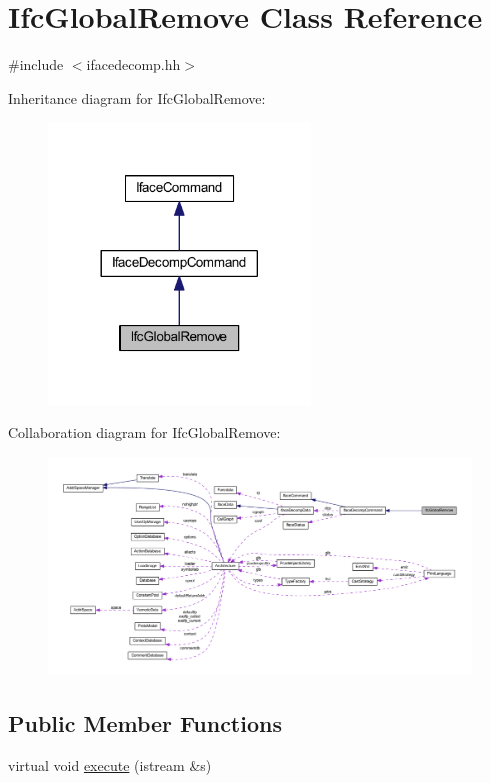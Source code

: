 \hypertarget{class_ifc_global_remove}{}\section{Ifc\+Global\+Remove Class Reference}
\label{class_ifc_global_remove}


{\ttfamily \#include $<$ifacedecomp.\+hh$>$}



Inheritance diagram for Ifc\+Global\+Remove\+:
\nopagebreak
\begin{figure}[H]
\begin{center}
\leavevmode
\includegraphics[width=197pt]{class_ifc_global_remove__inherit__graph}
\end{center}
\end{figure}


Collaboration diagram for Ifc\+Global\+Remove\+:
\nopagebreak
\begin{figure}[H]
\begin{center}
\leavevmode
\includegraphics[width=350pt]{class_ifc_global_remove__coll__graph}
\end{center}
\end{figure}
\subsection*{Public Member Functions}
\begin{DoxyCompactItemize}
\item 
virtual void \mbox{\hyperlink{class_ifc_global_remove_acb81449b281ae69ff0dac554beeb0318}{execute}} (istream \&s)
\end{DoxyCompactItemize}
